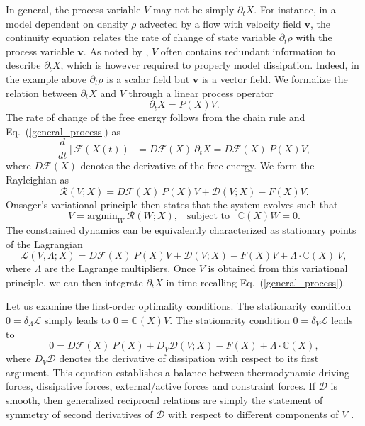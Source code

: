 \documentclass[12pt]{iopart}
\newcommand\eqref[1]{(\ref{#1})}
\begin{document}
	In general, the process variable $V$ may not be simply $\partial_t X$. For instance, in a model dependent on density $\rho$ advected by a flow with velocity field $\bm{v}$, the continuity equation relates the rate of change of state variable $\partial_t \rho$ with the process variable $\bm{v}$. As noted by \cite{Otto2001,peletier2014variational}, $V$ often contains redundant information to describe $\partial_t{X}$, which is however required to properly model dissipation. Indeed, in the example above $\partial_t \rho$ is a scalar field but $\bm{v}$ is a vector field. We formalize the relation between $\partial_t X$ and $V$ through a linear process operator 
	\begin{equation}
		\label{general_process}
		\partial_t{X}=P(X)V.
	\end{equation} 
	The rate of change of the free energy follows from the chain rule and Eq.~(\ref{general_process}) as
	\begin{equation}
		\frac{d}{dt}\left[ \mathcal{F}(X(t)) \right] = D\mathcal{F}(X)~\partial_t {X} = D\mathcal{F}(X)~P(X)V,
	\end{equation}
	where $D\mathcal{F}(X)$ denotes the derivative of the free energy. We form the Rayleighian  as
	\begin{equation}
		\label{rayleighian}
		\mathcal{R}(V;X) = D\mathcal{F}(X)~P(X)V  + \mathcal{D}(V;X) -F(X) V.
	\end{equation}
	Onsager's variational principle then states that the system evolves such that
	\begin{equation}
		\label{Onsagermain}
		V = {\text{argmin}}_{W}~\mathcal{R}(W;X), \;\;\; \mbox{subject to} \;\;\; \mathbb{C}(X) W=0.
	\end{equation}
	The constrained dynamics can be equivalently characterized as stationary points of the Lagrangian
	\begin{equation}
		\mathcal{L}(V,\Lambda;X) = D\mathcal{F}(X)~P(X)V  + \mathcal{D}(V;X)  -F(X) V + \Lambda\cdot\mathbb{C}(X)~V,
	\end{equation}
	where $\Lambda$ are the Lagrange multipliers. Once $V$ is obtained from this variational principle, we can then integrate $\partial_t{X}$ in time recalling Eq.~\eqref{general_process}. 
	
	Let us examine the first-order optimality conditions. The stationarity condition $0 = \delta_\Lambda \mathcal{L}$ simply leads to $0 = \mathbb{C}(X)V$. The stationarity condition $0 = \delta_V \mathcal{L}$ leads to
	\begin{equation}
		\label{weakgen}
		0 = D \mathcal{F}(X)~P(X)  + D_V\mathcal{D}(V;X) -F(X) +  \Lambda\cdot\mathbb{C}(X),
	\end{equation}
	where $D_V\mathcal{D}$ denotes the derivative of dissipation with respect to its first argument. This equation establishes a balance between thermodynamic driving forces, dissipative forces, external/active forces and constraint forces. If $\mathcal{D}$ is smooth, then generalized reciprocal relations are simply the statement of symmetry of second derivatives of $\mathcal{D}$ with respect to different components of $V$ \cite{EDELEN1972481}.
	
\end{document}
